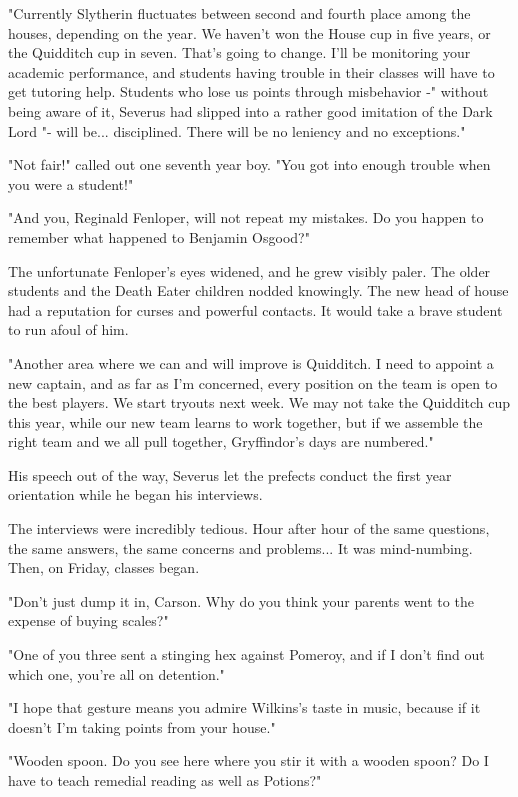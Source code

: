 "Currently Slytherin fluctuates between second and fourth place among the houses, depending on the year. We haven't won the House cup in five years, or the Quidditch cup in seven. That's going to change. I'll be monitoring your academic performance, and students having trouble in their classes will have to get tutoring help. Students who lose us points through misbehavior -" without being aware of it, Severus had slipped into a rather good imitation of the Dark Lord "- will be... disciplined. There will be no leniency and no exceptions."

"Not fair!" called out one seventh year boy. "You got into enough trouble when you were a student!"

"And you, Reginald Fenloper, will not repeat my mistakes. Do you happen to remember what happened to Benjamin Osgood?"

The unfortunate Fenloper's eyes widened, and he grew visibly paler. The older students and the Death Eater children nodded knowingly. The new head of house had a reputation for curses and powerful contacts. It would take a brave student to run afoul of him.

"Another area where we can and will improve is Quidditch. I need to appoint a new captain, and as far as I'm concerned, every position on the team is open to the best players. We start tryouts next week. We may not take the Quidditch cup this year, while our new team learns to work together, but if we assemble the right team and we all pull together, Gryffindor's days are numbered."

His speech out of the way, Severus let the prefects conduct the first year orientation while he began his interviews.

The interviews were incredibly tedious. Hour after hour of the same questions, the same answers, the same concerns and problems... It was mind-numbing. Then, on Friday, classes began.

"Don't just dump it in, Carson. Why do you think your parents went to the expense of buying scales?"

"One of you three sent a stinging hex against Pomeroy, and if I don't find out which one, you're all on detention."

"I hope that gesture means you admire Wilkins's taste in music, because if it doesn't I'm taking points from your house."

"Wooden spoon. Do you see here where you stir it with a wooden spoon? Do I have to teach remedial reading as well as Potions?"

